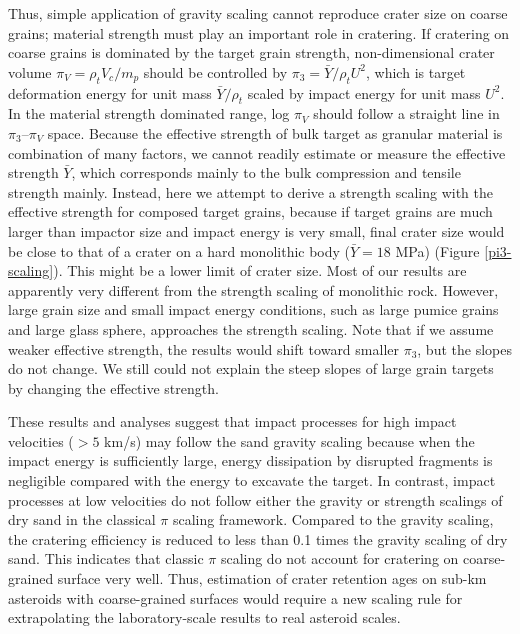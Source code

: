 \documentclass[3p,authoryear]{elsarticle}
\newcommand{\red}[1]{\textcolor{red}{#1}}
\begin{document}
Thus, simple application of gravity scaling cannot reproduce crater size on coarse grains; material strength must play an important role in cratering.
If cratering on coarse grains is dominated by the target grain strength, non-dimensional crater volume $\pi_V=\rho_t V_c/m_p$ should be controlled by $\pi_3=\bar{Y}/ \rho_t U^2$, which is target deformation energy for unit mass $\bar{Y}/\rho_t$ scaled by impact energy for unit mass $U^2$.
In the material strength dominated range, log $\pi_V$ should follow a straight line in $\pi_3$--$\pi_V$ space.
Because the effective strength of bulk target as granular material is combination of many factors, we cannot readily estimate or measure the effective strength $\bar{Y}$, which corresponds mainly to the bulk compression and tensile strength mainly.
Instead, here we attempt to derive a strength scaling with the effective strength for composed target grains, because if target grains are much larger than impactor size and impact energy is very small, final crater size would be close to that of a crater on a hard monolithic body ($\bar{Y}=18$ MPa) (Figure \ref{pi3-scaling}).
This might be a lower limit of crater size.
Most of our results are apparently very different from the strength scaling of monolithic rock. However, large grain size and small impact energy conditions, such as large pumice grains and large glass sphere, approaches the strength scaling.
Note that if we assume weaker effective strength, the results would shift toward smaller $\pi_3$, but the slopes do not change.
We still could not explain the steep slopes of large grain targets by changing the effective strength.

These results and analyses suggest that impact processes for high impact velocities ($> 5$ km/s) may follow the sand gravity scaling because when the impact energy is sufficiently large, energy dissipation by disrupted fragments is negligible compared with the energy to excavate the target.
In contrast, impact processes at low velocities do not follow either the gravity or strength scalings of dry sand in the classical $\pi$ scaling framework.
Compared to the gravity scaling, the cratering efficiency is reduced to less than 0.1 times the gravity scaling of dry sand.
This indicates that classic $\pi$ scaling do not account for cratering on coarse-grained surface very well. Thus, estimation of crater retention ages on sub-km asteroids with coarse-grained surfaces would require a new scaling rule for extrapolating the laboratory-scale results to real asteroid scales.
\end{document}
